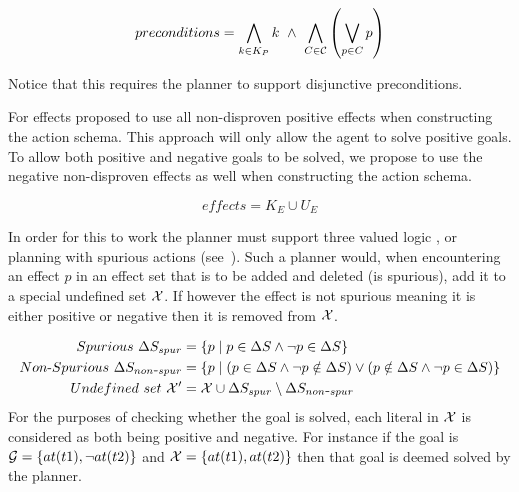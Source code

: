 \documentclass[\master/Master.tex]{subfiles}
\begin{document}
	\begin{equation} \label{eq:nca:opt-preconds}
		preconditions = 
		\bigwedge\limits_{k \in K_P} k ~ \land ~ \bigwedge \limits_{C \in \mathcal{C}} \left( \bigvee \limits_{p \in C} p\right)
	\end{equation}

	Notice that this requires the planner to support disjunctive preconditions.

	For effects \cite{Walsh2008} proposed to use all non-disproven positive effects when constructing the action schema. 
	This approach will only allow the agent to solve positive goals.
	To allow both positive and negative goals to be solved, we propose to use the negative non-disproven effects as well when constructing the action schema.

	\begin{equation}
		effects =  K_E \cup U_E
	\end{equation}

    In order for this to work the planner must support three valued logic \cite{putnam1957a}, or planning with spurious actions (see~\cite{Russell}).
	Such a planner would, when encountering an effect $p$ in an effect set \geffects that is to be added and deleted (is spurious), add it to a special undefined set $\mathcal{X}$.
	If however the effect is not spurious meaning it is either positive or negative then it is removed from $\mathcal{X}$.

			\begin{equation}
				\begin{split}
					Spurious~\Delta S_{spur} &= \{ p \mid p \in \Delta S \land \neg p \in \Delta S \} \\
					Non\text{-}Spurious~\Delta S_{non\texttt{-}spur} &= \{ p \mid (p \in \Delta S \land \neg p \notin \Delta S ) \lor (p \notin \Delta S \land \neg p \in \Delta S )  \}\\
					Undefined~set~\mathcal{X}' &= \mathcal{X} \cup \Delta S_{spur} \setminus \Delta S_{non\texttt{-}spur}
				\end{split}
			\end{equation}
	For the purposes of checking whether the goal is solved, each literal in $\mathcal{X}$ is considered as both being positive and negative.
	For instance if the goal is $\mathcal{G} = \{at(t1), \neg at(t2)\}$ and $\mathcal{X} = \{at(t1), at(t2)\}$ then that goal is deemed solved by the planner.
\end{document}
